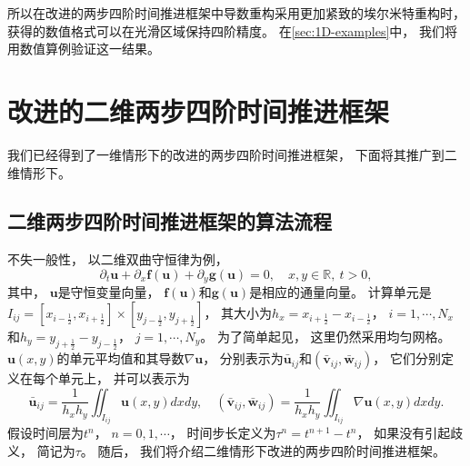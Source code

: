 所以在改进的两步四阶时间推进框架中导数重构采用更加紧致的埃尔米特重构时，
获得的数值格式可以在光滑区域保持四阶精度。
在\cref{sec:1D-examples}中，
我们将用数值算例验证这一结果。

\section{改进的二维两步四阶时间推进框架}
\label{sec:2D-S2O4}

我们已经得到了一维情形下的改进的两步四阶时间推进框架，
下面将其推广到二维情形下。

\subsection{二维两步四阶时间推进框架的算法流程}
\label{sec:2D-framework}

不失一般性，
以二维双曲守恒律为例，
\begin{equation}
  \label{eq:2D-law}
  {\partial_{t}}{\bm{u}} + {\partial_{x}}{\bm{f}}({\bm{u}}) + {\partial_{y}}{\bm{g}}({\bm{u}}) = 0, \quad x,y \in \mathbb{R},~t>0,
\end{equation}
其中，
${\bm{u}}$是守恒变量向量，
${\bm{f}}({\bm{u}})$和${\bm{g}}({\bm{u}})$是相应的通量向量。
计算单元是$I_{ij}=[x_{i-\frac 12},x_{i+\frac 12}]\times[y_{j-\frac 12},y_{j+\frac 12}]$，
其大小为$h_x=x_{i+\frac 12}-x_{i-\frac 12}$，
$i=1,\cdots, N_x$和$h_y=y_{j+\frac 12}-y_{j-\frac 12}$，
$j=1,\cdots, N_y$。
为了简单起见，
这里仍然采用均匀网格。
${\bm{u}}(x,y)$的单元平均值和其导数$\nabla {\bm{u}}$，
分别表示为$\bar{\bm{u}}_{ij}$和$(\bar{\bm{v}}_{ij},\bar{\bm{w}}_{ij})$，
它们分别定义在每个单元上，
并可以表示为
\begin{equation}
  \label{eq:2D-average}
  \bar{\bm{u}}_{ij}=\frac{1}{h_xh_y}\iint_{I_{ij}} {\bm{u}}(x, y) dxdy, \quad
  (\bar{\bm{v}}_{ij},\bar{\bm{w}}_{ij})=\frac{1}{h_xh_y}\iint_{I_{ij}} \nabla {\bm{u}} (x, y) dxdy.
\end{equation}
假设时间层为$t^n$，
$n=0,1,\cdots$，
时间步长定义为$\tau^n = t^{n+1} - t^{n}$，
如果没有引起歧义，
简记为$\tau$。
随后，
我们将介绍二维情形下改进的两步四阶时间推进框架。

